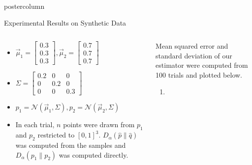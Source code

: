 \documentclass[final,hyperref={pdfpagelabels=false}]{beamer}
\begin{document}
\begin{frame}
\begin{columns}
\begin{column}{.32\textwidth}
\begin{beamercolorbox}[center,wd=\textwidth]{postercolumn}
\begin{minipage}[T]{.95\textwidth}
{            \begin{block}{Experimental Results on Synthetic Data}
              \begin{columns}
                \begin{column}{.5\textwidth}
                  \begin{itemize}
                  \item $\displaystyle
                          \vec\mu_1 = \begin{bmatrix} 0.3\\0.3\\0.3 \end{bmatrix},
                          \vec\mu_2 = \begin{bmatrix} 0.7\\0.7\\0.7 \end{bmatrix}$
                  \item $\displaystyle
                          \Sigma = \begin{bmatrix}
                                      0.2 & 0   & 0   \\
                                      0   & 0.2 & 0   \\
                                      0   & 0   & 0.3
                                   \end{bmatrix}$
                  \item $p_1 = \mathcal{N}(\vec\mu_1,\Sigma),
                         p_2 = \mathcal{N}(\vec\mu_2,\Sigma)$
                  \item In each trial, $n$ points were drawn from $p_1$ and
                        $p_2$ restricted to $[0,1]^3$.
                        $D_\alpha(\hat p \| \hat q)$ was computed from the
                        samples and $D_\alpha(p_1\|p_2)$ was computed directly.
                  \end{itemize}
                \end{column}
                \begin{column}{.49\textwidth}
                  {\footnotesize
                  Mean squared error and standard deviation of our
                  estimator were computed from 100 trials and plotted below.}
                  \begin{enumerate}[]
                  \item
                  \end{enumerate}
                 \vspace{-10mm}
                  \begin{figure}[h!]

\end{figure}
\end{column}
\end{columns}
\end{block}}
\end{minipage}
\end{beamercolorbox}
\end{column}
\end{columns}
\end{frame}
\end{document}
